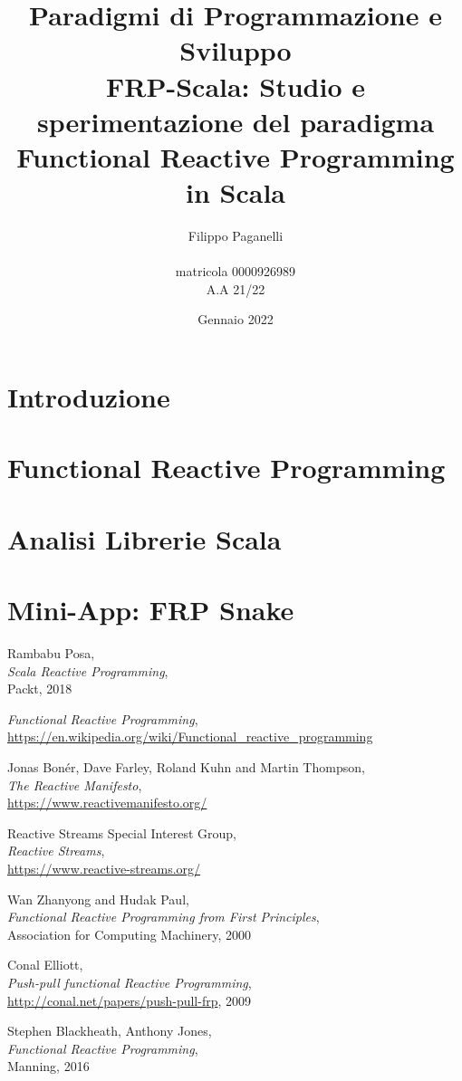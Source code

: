 \documentclass{report}
\title{\LARGE \textbf{Paradigmi di Programmazione e Sviluppo} \\ FRP-Scala: Studio e sperimentazione del paradigma Functional Reactive Programming in Scala
}
\author{
    Filippo Paganelli \\ \emailaddr{filippo.paganelli3@studio.unibo.it}
    \\ matricola 0000926989 \\ A.A 21/22
}
\date{Gennaio 2022}
\begin{document}
\maketitle
\newpage
\tableofcontents

\newpage
\chapter{Introduzione}\label{introduzione}


\newpage
\chapter{Functional Reactive Programming}\label{frp}


\newpage
\chapter{Analisi Librerie Scala}\label{analisi}


\newpage
\chapter{Mini-App: FRP Snake}\label{mini-app}


\newpage
\begin{thebibliography}{4}

Rambabu Posa, \\ \textit{Scala Reactive Programming}, \\ Packt, 2018

\textit{Functional Reactive Programming}, \\
\url{https://en.wikipedia.org/wiki/Functional_reactive_programming}

Jonas Bonér, Dave Farley, Roland Kuhn and Martin Thompson, \\ \textit{The Reactive Manifesto}, \\
  \url{https://www.reactivemanifesto.org/}

Reactive Streams Special Interest Group, \\ \textit{Reactive Streams}, \\
  \url{https://www.reactive-streams.org/}

Wan Zhanyong and Hudak Paul, \\ \textit{Functional Reactive Programming from First Principles}, \\
Association for Computing Machinery, 2000

Conal Elliott, \\ \textit{Push-pull functional Reactive Programming}, \\
\url{http://conal.net/papers/push-pull-frp}, 2009

Stephen Blackheath, Anthony Jones, \\ \textit{Functional Reactive Programming}, \\
Manning, 2016

\end{thebibliography}
\end{document}
